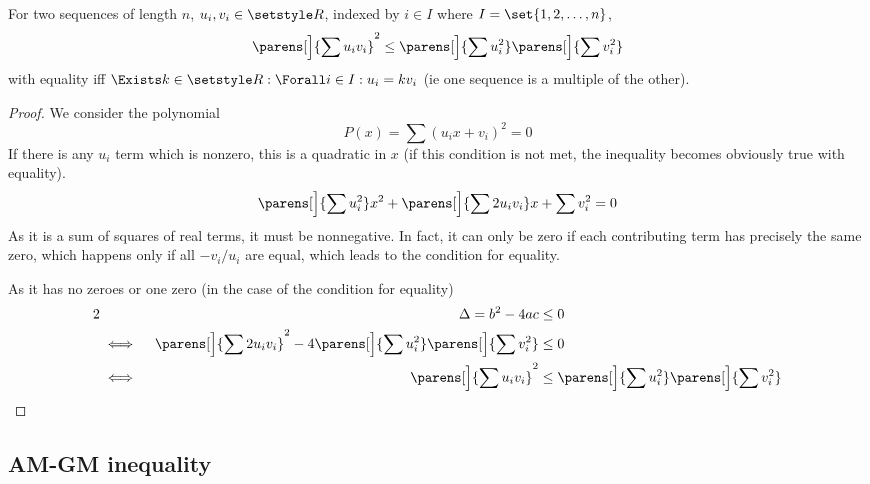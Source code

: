 \begin{theorem}
 For two sequences of length \(n\), \(u_i, v_i \in \Reals\), indexed by
 \(i \in I\) where \(I = \set{1, 2, \dotsc, n}\),
 \begin{equation*}
  \parens[\Big]{\sum u_i v_i}^2 \le
      \parens[\Big]{\sum u_i^2} \parens[\Big]{\sum v_i^2}
 \end{equation*}
 with equality iff \(\Exists k \in \Reals: \Forall i \in I: u_i = k v_i\) (ie
 one sequence is a multiple of the other).
\end{theorem}
\begin{proof}
    We consider the polynomial
    \begin{equation*}
    P(x) = \sum (u_i x + v_i)^2 = 0
    \end{equation*}
    If there is any \(u_i\) term which is nonzero, this is a quadratic in \(x\)
    (if this condition is not met, the inequality becomes obviously true with
    equality).
    \begin{equation*}
     \parens[\Big]{\sum u_i^2} x^2 +
     \parens[\Big]{\sum 2 u_i v_i} x + \sum v_i^2 = 0
    \end{equation*}
    As it is a sum of squares of real terms, it must be nonnegative. In fact, it
    can only be zero if each contributing term has precisely the same zero,
    which happens only if all \(-v_i/u_i\) are equal, which leads to the
    condition for equality.

    As it has no zeroes or one zero (in the case of the condition for equality)
    \begin{alignat*}2
     &&\Delta = b^2 - 4ac &\le 0 \\
     &\iff{}&
     \parens[\Big]{\sum 2 u_i v_i}^2 -
                4\parens[\Big]{\sum u_i^2}\parens[\Big]{\sum v_i^2} &\le 0 \\
     &\iff{}& \parens[\Big]{\sum u_i v_i}^2
         &\le \parens[\Big]{\sum u_i^2} \parens[\Big]{\sum v_i^2} \qedhere
    \end{alignat*}
\end{proof}

\subsection{AM-GM inequality}

